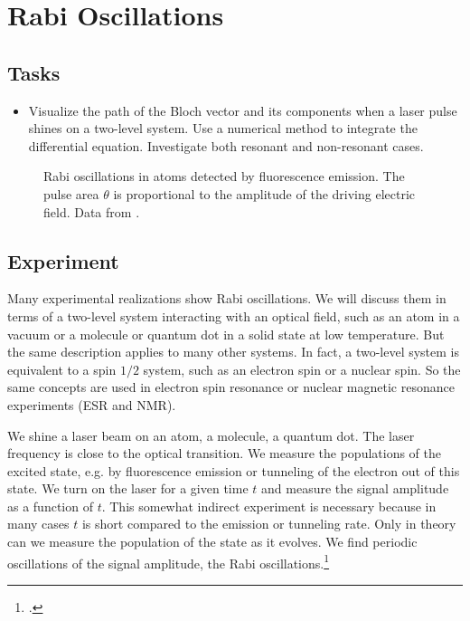 \renewcommand{\lastmod}{May 24, 2024}
\renewcommand{\chapterauthors}{Markus Lippitz}


\chapter{Rabi Oscillations}



\section{Tasks}

\begin{itemize}
\item  Visualize the  path of the Bloch vector and its components when a laser pulse shines on a two-level system. Use a numerical method to integrate the differential equation. Investigate both resonant and non-resonant cases.
\end{itemize}


\begin{figure}[h!]
  \caption{Rabi oscillations in  atoms detected by fluorescence emission. The pulse area $\theta$ is proportional to the amplitude of the driving electric field. Data from \cite{Gibbs1973}.}
\end{figure}

\section{Experiment}

Many experimental realizations show Rabi oscillations. We will discuss them in terms of a two-level system interacting with an optical field, such as an atom in a vacuum or a molecule or quantum dot in a solid state at low temperature. But the same description applies to many other systems. In fact, a two-level system is equivalent to a spin $1/2$ system, such as an electron spin or a nuclear spin. So the same concepts are used in electron spin resonance or nuclear magnetic resonance experiments (ESR and NMR).

We shine a laser beam on an atom, a molecule, a quantum dot. The laser frequency is close to the optical transition. We measure the populations of the excited state, e.g. by fluorescence emission or tunneling of the electron out of this state. We turn on the laser for a given time $t$ and measure the signal amplitude as a function of $t$. This somewhat indirect experiment is necessary because in many cases $t$ is short compared to the emission or tunneling rate. Only in theory can we measure the population of the state as it evolves. We find periodic oscillations of the signal amplitude, the Rabi oscillations.\footcite{Rabi1939}


